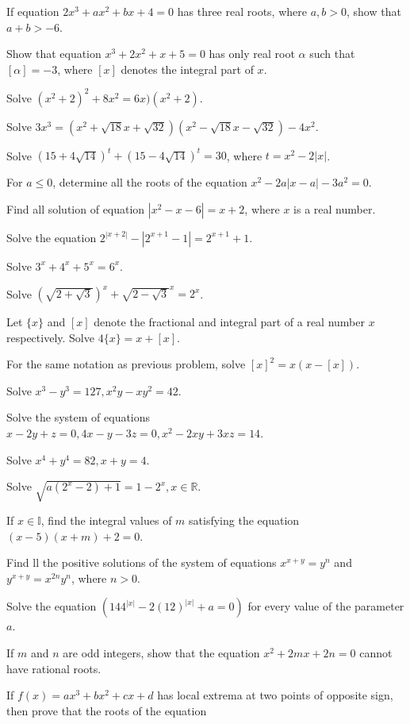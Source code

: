 \item If equation $2x^3 + ax^2 + bx + 4 = 0$ has three real roots, where $a, b > 0$, show that $a + b>-6$.
\item Show that equation $x^3 + 2x^2 + x + 5 = 0$ has only real root $\alpha$ such that $[\alpha] = -3$, where $[x]$ denotes the
  integral part of $x$.
\item Solve $(x^2 + 2)^2 + 8x^2 = 6x)(x^2 + 2)$.
\item Solve $3x^3 = (x^2 + \sqrt{18}x + \sqrt{32})(x^2 - \sqrt{18}x - \sqrt{32}) - 4x^2$.
\item Solve $(15 + 4\sqrt{14})^t + (15 - 4\sqrt{14})^t = 30$, where $t = x^2 - 2|x|$.
\item For $a\leq 0$, determine all the roots of the equation $x^2 - 2a|x - a| - 3a^2 = 0$.
\item Find all solution of equation $|x^2 - x - 6| = x + 2$, where $x$ is a real number.
\item Solve the equation $2^{|x + 2|} - |2^{x + 1} - 1| = 2^{x + 1} + 1$.
\item Solve $3^x + 4^x + 5^x = 6^x$.
\item Solve $(\sqrt{2 + \sqrt{3}})^x + \sqrt{2 - \sqrt{3}}^x = 2^x$.
\item Let $\{x\}$ and $[x]$ denote the fractional and integral part of a real number $x$ respectively. Solve $4\{x\} = x + [x]$.
\item For the same notation as previous problem, solve $[x]^2 = x(x - [x])$.
\item Solve $x^3 - y^3 = 127, x^2y - xy^2 = 42$.
\item Solve the system of equations $x - 2y + z = 0, 4x- y - 3z = 0, x^2 - 2xy + 3xz = 14$.
\item Solve $x^4 + y^4 = 82, x + y = 4$.
\item Solve $\sqrt{a(2^x - 2) + 1} = 1 - 2^x, x\in\mathbb{R}$.
\item If $x\in\mathbb{I}$, find the integral values of $m$ satisfying the equation $(x - 5)(x + m) + 2 = 0$.
\item Find ll the positive solutions of the system of equations $x^{x + y} = y^n$ and $y^{x + y} = x^{2n}y^n$, where $n > 0$.
\item Solve the equation $(144^{|x|} - 2(12)^{|x|} + a = 0)$ for every value of the parameter $a$.
\item If $m$ and $n$ are odd integers, show that the equation $x^2 + 2mx + 2n = 0$ cannot have rational roots.
\item If $f(x) = ax^3 + bx^2 + cx + d$ has local extrema at two points of opposite sign, then prove that the roots of the equation

